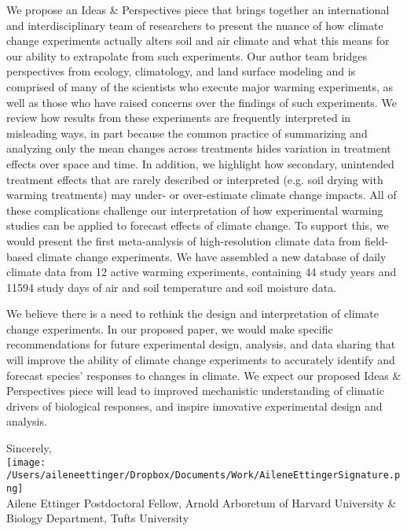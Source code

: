 \documentclass[12pt,a4paper]{letter}
\begin{document}
\begin{letter}{}
We propose an Ideas \& Perspectives piece that  brings together an international and interdisciplinary team of researchers to present the nuance of how climate change experiments actually alters soil and air climate and what this means for our ability to extrapolate from such experiments. Our author team bridges perspectives from ecology, climatology, and land surface modeling and is comprised of many of the scientists who execute major warming experiments, as well as those who have raised concerns over the findings of such experiments. We review how results from these experiments are frequently interpreted in misleading ways, in part because the common practice of summarizing and analyzing only the mean changes across treatments hides variation in treatment effects over space and time. In addition, we highlight how secondary, unintended treatment effects that are rarely described or interpreted (e.g. soil drying with warming treatments) may under- or over-estimate climate change impacts. All of these complications challenge our interpretation of how experimental warming studies can be applied to forecast effects of climate change. To support this, we would present the first meta-analysis of high-resolution climate data from field-based climate change experiments. We have assembled a new database of daily climate data from 12 active warming experiments, containing 44 study years and 11594 study days of air and soil temperature and soil moisture data. 

We believe there is a need to rethink the design and interpretation of climate change experiments. In our proposed paper, we would make specific recommendations for future experimental design, analysis, and data sharing that will improve the ability of climate change experiments to accurately identify and forecast species' responses to changes in climate. We expect our proposed Ideas \& Perspectives piece will lead to improved mechanistic understanding of climatic drivers of biological responses, and inspire innovative experimental design and analysis. 

Sincerely,\\

\texttt{[image: /Users/aileneettinger/Dropbox/Documents/Work/AileneEttingerSignature.png]} \\
Ailene Ettinger
Postdoctoral Fellow, Arnold Arboretum of Harvard University \& Biology Department, Tufts University


\end{letter}
\end{document}
